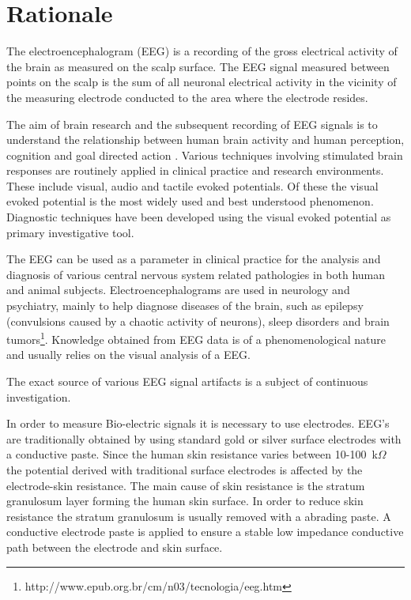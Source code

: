 

\section{Rationale}

The electroencephalogram (EEG) is a recording of the gross electrical
activity of the brain as measured on the scalp surface. The EEG signal
measured between points on the scalp is the sum of all neuronal
electrical activity in the vicinity of the measuring electrode
conducted to the area where the electrode resides.

The aim of brain research and the subsequent recording of EEG signals
is to understand the relationship between human brain activity and
human perception, cognition and goal directed action
\cite{human}. Various techniques involving stimulated brain responses
are routinely applied in clinical practice and research
environments. These include visual, audio and tactile evoked
potentials. Of these the visual evoked potential is the most widely
used and best understood phenomenon. Diagnostic techniques have been
developed using the visual evoked potential as primary investigative
tool.

The EEG can be used as a parameter in clinical practice for the
analysis and diagnosis of various central nervous system related
pathologies in both human and animal subjects. Electroencephalograms
are used in neurology and psychiatry, mainly to help diagnose diseases
of the brain, such as epilepsy (convulsions caused by a chaotic
activity of neurons), sleep disorders and brain
tumors\footnote{http://www.epub.org.br/cm/n03/tecnologia/eeg.htm}. Knowledge
obtained from EEG data is of a phenomenological nature and usually
relies on the visual analysis of a EEG.

The exact source of various EEG signal artifacts is a subject of
continuous investigation.


In order to measure Bio-electric signals it is necessary to use
electrodes. EEG's are traditionally obtained by using standard gold or
silver surface electrodes with a conductive paste. Since the human
skin resistance varies between 10-100~k$\Omega$
\cite{active-electrode-ca} the potential derived with traditional
surface electrodes is affected by the electrode-skin resistance. The
main cause of skin resistance is the stratum granulosum layer forming
the human skin surface. In order to reduce skin resistance the stratum
granulosum is usually removed with a abrading paste. A conductive
electrode paste is applied to ensure a stable low impedance conductive
path between the electrode and skin surface.

